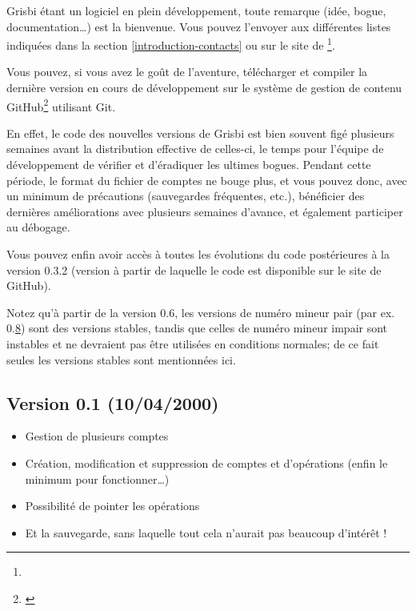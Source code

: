 Grisbi étant un logiciel en plein développement, toute remarque (idée, bogue, documentation\dots{}) est la bienvenue. Vous pouvez l'envoyer aux différentes listes indiquées dans la section \vref{introduction-contacts}  ou sur le site de \footnote{\urlGrisbi{}}.

Vous pouvez, si vous avez le goût de l'aventure, télécharger et compiler la dernière version en cours de développement sur le système de gestion de contenu \gls{GitHub}\footnote{\urlGitHubGrisbi{}\label{siteGitHubGrisbi}} utilisant \gls{Git}.

En effet, le code des nouvelles versions de Grisbi est bien souvent figé plusieurs semaines avant la distribution effective de celles-ci, le temps pour l'équipe de développement de vérifier et d'éradiquer les ultimes bogues. Pendant cette période, le format du fichier de comptes ne bouge plus, et vous pouvez donc, avec un minimum de précautions (sauvegardes fréquentes, etc.), bénéficier des dernières améliorations avec plusieurs semaines d'avance, et également participer au débogage.

Vous pouvez enfin avoir accès à toutes les évolutions du code postérieures à la version 0.3.2 (version à partir de laquelle le code est disponible sur le site de \gls{GitHub}).

Notez qu'à partir de la version 0.6, les versions de numéro mineur pair (par ex. 0.\underline8) sont des versions stables, tandis que celles de numéro mineur impair sont instables et ne devraient pas être utilisées en conditions normales; de ce fait seules les versions stables sont mentionnées ici.

\newpage

\subsection{Version 0.1 \textnormal{(10/04/2000)}}

\begin{itemize}
	\item Gestion de plusieurs comptes
	\item Création, modification et suppression de comptes et d'opérations (enfin le minimum pour fonctionner\dots{})
	\item Possibilité de pointer les opérations
	\item Et la sauvegarde, sans laquelle tout cela n'aurait pas beaucoup d'intérêt !
\end{itemize}

